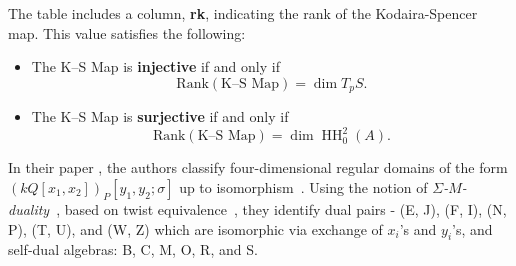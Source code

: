\documentclass{amsart}
\def\HH{\operatorname{HH}}
\begin{document}
The table includes a column, \textbf{rk}, indicating the rank of the Kodaira-Spencer map. This value satisfies the following:
\begin{itemize}
    \item The K–S Map is \textbf{injective} if and only if
    $$
    \mathrm{Rank}(\text{K–S Map}) = \dim T_p S.
    $$
    \item The K–S Map is \textbf{surjective} if and only if
    $$
    \mathrm{Rank}(\text{K–S Map}) = \dim \HH^2_0(A).
    $$
\end{itemize}


\noindent In their paper \cite{MR2529094}, the authors classify four-dimensional regular domains of the form \( (kQ[x_1, x_2])_P[y_1, y_2; \sigma] \) up to isomorphism~\cite[Proposition~4.4]{MR2529094}. Using the notion of \emph{\(\Sigma\)-\(M\)-duality}~\cite[Definition~4.3]{MR2529094}, based on twist equivalence~\cite[Definition~3.3]{MR2529094}, they identify dual pairs - (E, J), (F, I), (N, P), (T, U), and (W, Z) which are isomorphic via exchange of \( x_i \)'s and \( y_i \)'s, and self-dual algebras: B, C, M, O, R, and S.%
\end{document}
